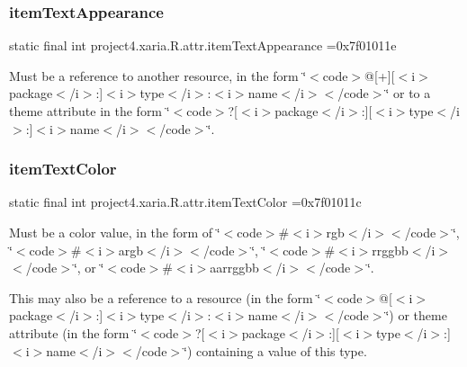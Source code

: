 \subsubsection{\texorpdfstring{item\+Text\+Appearance}{itemTextAppearance}}
{\footnotesize\ttfamily static final int project4.\+xaria.\+R.\+attr.\+item\+Text\+Appearance =0x7f01011e\hspace{0.3cm}{\ttfamily [static]}}

Must be a reference to another resource, in the form \char`\"{}$<$code$>$@\mbox{[}+\mbox{]}\mbox{[}$<$i$>$package$<$/i$>$\+:\mbox{]}$<$i$>$type$<$/i$>$\+:$<$i$>$name$<$/i$>$$<$/code$>$\char`\"{} or to a theme attribute in the form \char`\"{}$<$code$>$?\mbox{[}$<$i$>$package$<$/i$>$\+:\mbox{]}\mbox{[}$<$i$>$type$<$/i$>$\+:\mbox{]}$<$i$>$name$<$/i$>$$<$/code$>$\char`\"{}. \mbox{\label{classproject4_1_1xaria_1_1R_1_1attr_a5f7abe3d9281c4cd7fed8de7396fc015}} 
\subsubsection{\texorpdfstring{item\+Text\+Color}{itemTextColor}}
{\footnotesize\ttfamily static final int project4.\+xaria.\+R.\+attr.\+item\+Text\+Color =0x7f01011c\hspace{0.3cm}{\ttfamily [static]}}

Must be a color value, in the form of \char`\"{}$<$code$>$\#$<$i$>$rgb$<$/i$>$$<$/code$>$\char`\"{}, \char`\"{}$<$code$>$\#$<$i$>$argb$<$/i$>$$<$/code$>$\char`\"{}, \char`\"{}$<$code$>$\#$<$i$>$rrggbb$<$/i$>$$<$/code$>$\char`\"{}, or \char`\"{}$<$code$>$\#$<$i$>$aarrggbb$<$/i$>$$<$/code$>$\char`\"{}. 

This may also be a reference to a resource (in the form \char`\"{}$<$code$>$@\mbox{[}$<$i$>$package$<$/i$>$\+:\mbox{]}$<$i$>$type$<$/i$>$\+:$<$i$>$name$<$/i$>$$<$/code$>$\char`\"{}) or theme attribute (in the form \char`\"{}$<$code$>$?\mbox{[}$<$i$>$package$<$/i$>$\+:\mbox{]}\mbox{[}$<$i$>$type$<$/i$>$\+:\mbox{]}$<$i$>$name$<$/i$>$$<$/code$>$\char`\"{}) containing a value of this type. \mbox{\label{classproject4_1_1xaria_1_1R_1_1attr_aabf98c4ea8ca8fc5fb46ca65843b864b}} 
